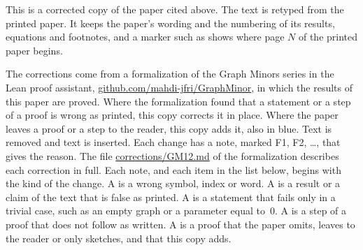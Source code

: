 
This is a corrected copy of the paper cited above. The text is retyped from the printed paper.
It keeps the paper's wording and the numbering of its results, equations and footnotes, and a
marker such as  shows where page $N$ of the printed paper begins.

The corrections come from a formalization of the Graph Minors series in the Lean proof
assistant, \href{https://github.com/mahdi-jfri/GraphMinor}{github.com/mahdi-jfri/GraphMinor},
in which the results of this paper are proved. Where the formalization found that a statement
or a step of a proof is wrong as printed, this copy corrects it in place. Where the paper leaves a proof or a step to the reader, this copy adds it, also in blue. Text  is removed and text  is inserted. Each change has a note, marked
\textcolor{fixcolor}{\sffamily F1}, \textcolor{fixcolor}{\sffamily F2}, \dots, that gives the
reason. The file
\href{https://github.com/mahdi-jfri/GraphMinor/blob/main/corrections/GM12.md}{corrections/GM12.md}
of the formalization describes each correction in full. Each note, and each item in the list below, begins with the kind of the change. A  is a wrong symbol, index or word. A  is a result or a claim of the text that is false as printed. A  is a statement that fails only in a trivial case, such as an empty graph or a parameter equal to~$0$. A  is a step of a proof that does not follow as written. A  is a proof that the paper omits, leaves to the reader or only sketches, and that this copy adds.

